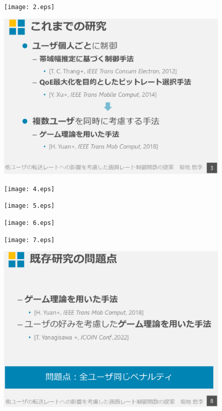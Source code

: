 \documentclass[a4paper,12pt,report]{jsbook}
\begin{document}
\begin{figure}[b]
  \centering
  \texttt{[image: 2.eps]}
\end{figure}

\begin{figure}[tp]
  \centering
  \includegraphics[scale=0.45]{3.eps}
\end{figure}

\begin{figure}[tb]
  \centering
  \texttt{[image: 4.eps]}
\end{figure}

\begin{figure}[tp]
  \centering
  \texttt{[image: 5.eps]}
\end{figure}

\begin{figure}[tb]
  \centering
  \texttt{[image: 6.eps]}
\end{figure}

\begin{figure}[tp]
  \centering
  \texttt{[image: 7.eps]}
\end{figure}

\begin{figure}[tb]
  \centering
  \includegraphics[scale=0.45]{8.eps}
\end{figure}
\end{document}
